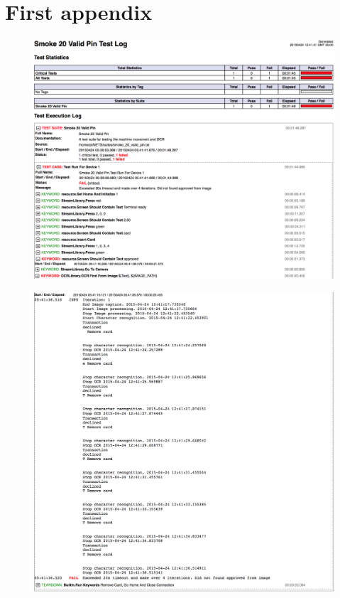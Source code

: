 
\chapter{First appendix}
\label{chapter:first-appendix}

\begin{figure}[htbp]
\begin{center}
\includegraphics[width=1\textwidth]{images/first_log.png}
\label{fig:passed}
\end{center}
\end{figure}

\begin{figure}[htbp]
\begin{center}
\includegraphics[width=1\textwidth]{images/second_log.png}
\label{fig:passed}
\end{center}
\end{figure}

%